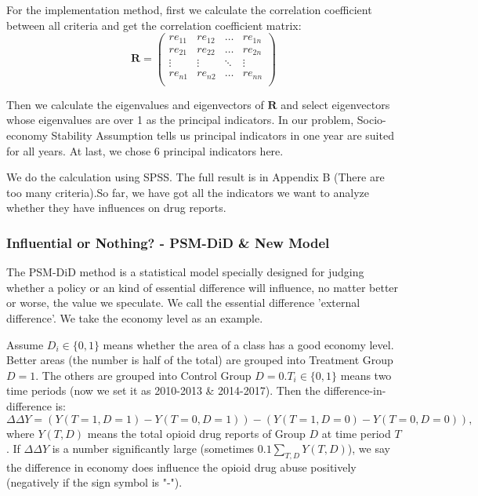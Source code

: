 \documentclass{mcmthesis}
\begin{document}
For the implementation method, first we calculate the correlation coefficient between all criteria and get the correlation coefficient matrix:
\[ \mathbf{R} = \left(
\begin{array}{cccc}
re_{11} & re_{12} & \ldots & re_{1n}\\
re_{21} & re_{22} & \ldots & re_{2n}\\
\vdots & \vdots & \ddots & \vdots\\
re_{n1} & re_{n2} & \ldots & re_{nn}\\
\end{array} \right) \]

Then we calculate the eigenvalues and eigenvectors of $\mathbf{R}$ and select eigenvectors whose eigenvalues are over 1 as the principal indicators. In our problem, Socio-economy Stability Assumption tells us principal indicators in one year are suited for all years. At last, we chose 6 principal indicators here.

We do the calculation using SPSS. The full result is in Appendix B (There are too many criteria).So far, we have got all the indicators we want to analyze whether they have influences on drug reports.
\subsubsection{Influential or Nothing? - PSM-DiD \& New Model}
The PSM-DiD method is a statistical model specially designed for judging whether a policy or an kind of essential difference will influence, no matter better or worse, the value we speculate. We call the essential difference 'external difference'. We take the economy level as an example.

Assume $D_i\in\{0,1\}$ means whether the area of a class has a good economy level. Better areas (the number is half of the total) are grouped into Treatment Group $D=1$. The others are grouped into Control Group $D=0$.$T_i\in\{0,1\}$ means two time periods (now we set it as 2010-2013 \& 2014-2017). Then the difference-in-difference is:
$$\Delta\Delta Y=(Y(T=1,D=1)-Y(T=0,D=1))-(Y(T=1,D=0)-Y(T=0,D=0)),$$
where $Y(T,D)$ means the total opioid drug reports of Group $D$ at time period $T$. If $\Delta\Delta Y$ is a number significantly large (sometimes $0.1\sum_{T,D}Y(T,D)$), we say the difference in economy does influence the opioid drug abuse positively (negatively if the sign symbol is "-").
\end{document}
